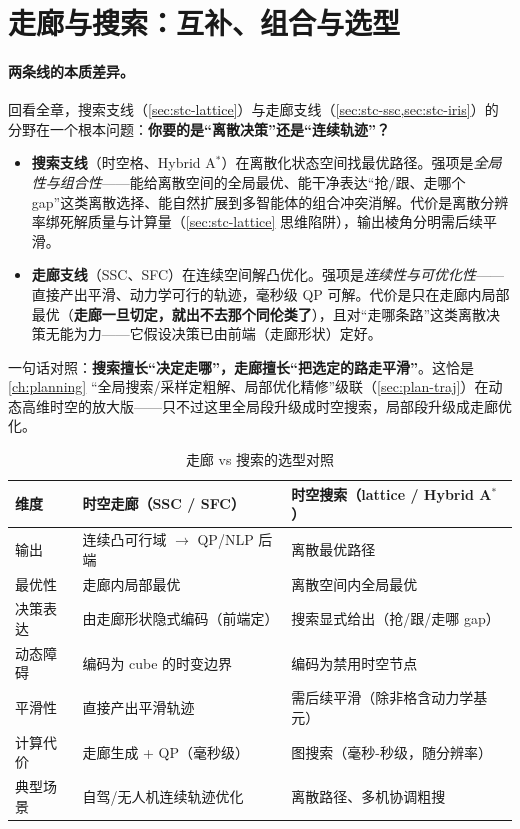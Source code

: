 \section{走廊与搜索：互补、组合与选型}
\label{sec:stc-combine}

\paragraph{两条线的本质差异。}
回看全章，搜索支线（\cref{sec:stc-lattice}）与走廊支线（\cref{sec:stc-ssc,sec:stc-iris}）的分野在一个根本问题：\textbf{你要的是“离散决策”还是“连续轨迹”？}
\begin{itemize}
  \item \textbf{搜索支线}（时空格、Hybrid A$^*$）在离散化状态空间找最优路径。强项是\emph{全局性与组合性}——能给离散空间的全局最优、能干净表达“抢/跟、走哪个 gap”这类离散选择、能自然扩展到多智能体的组合冲突消解。代价是离散分辨率绑死解质量与计算量（\cref{sec:stc-lattice} 思维陷阱），输出棱角分明需后续平滑。
  \item \textbf{走廊支线}（SSC、SFC）在连续空间解凸优化。强项是\emph{连续性与可优化性}——直接产出平滑、动力学可行的轨迹，毫秒级 QP 可解。代价是只在走廊内局部最优（\textbf{走廊一旦切定，就出不去那个同伦类了}），且对“走哪条路”这类离散决策无能为力——它假设决策已由前端（走廊形状）定好。
\end{itemize}
一句话对照：\textbf{搜索擅长“决定走哪”，走廊擅长“把选定的路走平滑”}。这恰是 \cref{ch:planning} “全局搜索/采样定粗解、局部优化精修”级联（\cref{sec:plan-traj}）在动态高维时空的放大版——只不过这里全局段升级成时空搜索，局部段升级成走廊优化。

\begin{table}[H]\centering\small
\caption{走廊 vs 搜索的选型对照}
\label{tab:stc-corridor-vs-search}
\begin{tabular}{lll}
\toprule
维度 & 时空走廊（SSC / SFC） & 时空搜索（lattice / Hybrid A$^*$） \\
\midrule
输出 & 连续凸可行域 $\to$ QP/NLP 后端 & 离散最优路径 \\
最优性 & 走廊内局部最优 & 离散空间内全局最优 \\
决策表达 & 由走廊形状隐式编码（前端定） & 搜索显式给出（抢/跟/走哪 gap） \\
动态障碍 & 编码为 cube 的时变边界 & 编码为禁用时空节点 \\
平滑性 & 直接产出平滑轨迹 & 需后续平滑（除非格含动力学基元） \\
计算代价 & 走廊生成 + QP（毫秒级） & 图搜索（毫秒-秒级，随分辨率） \\
典型场景 & 自驾/无人机连续轨迹优化 & 离散路径、多机协调粗搜 \\
\bottomrule
\end{tabular}
\end{table}

